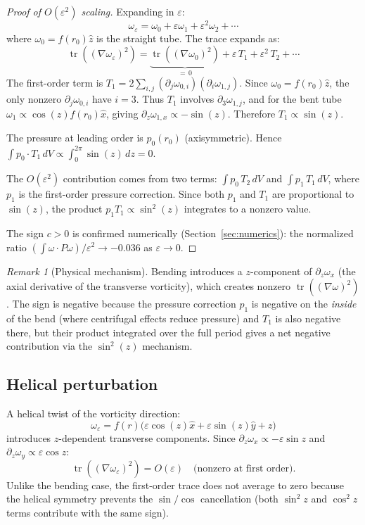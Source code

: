 \documentclass[11pt,a4paper]{article}
\theoremstyle{plain}
\theoremstyle{definition}
\theoremstyle{remark}
\newtheorem{remark}[theorem]{Remark}
\DeclareMathOperator{\tr}{tr}
\begin{document}
\begin{proof}[Proof of $O(\varepsilon^2)$ scaling]
Expanding in $\varepsilon$:
\[
\omega_\varepsilon = \omega_0 + \varepsilon\omega_1
+ \varepsilon^2\omega_2 + \cdots
\]
where $\omega_0 = f(r_0)\hat z$ is the straight
tube.  The trace expands as:
\[
\tr((\nabla\omega_\varepsilon)^2) =
\underbrace{\tr((\nabla\omega_0)^2)}_{=\,0}
+ \varepsilon\,T_1 + \varepsilon^2\,T_2 + \cdots
\]
The first-order term is
$T_1 = 2\sum_{i,j}(\partial_j\omega_{0,i})
(\partial_i\omega_{1,j})$.  Since
$\omega_0=f(r_0)\hat z$, the only nonzero
$\partial_j\omega_{0,i}$ have $i=3$.  Thus $T_1$
involves $\partial_3\omega_{1,j}$, and for the
bent tube $\omega_1 \propto \cos(z)f(r_0)\hat x$,
giving $\partial_z\omega_{1,x}\propto -\sin(z)$.
Therefore $T_1\propto\sin(z)$.

The pressure at leading order is $p_0(r_0)$
(axisymmetric).  Hence
$\int p_0\cdot T_1\,dV
\propto\int_0^{2\pi}\sin(z)\,dz = 0$.

The $O(\varepsilon^2)$ contribution comes from
two terms: $\int p_0\,T_2\,dV$ and
$\int p_1\,T_1\,dV$, where $p_1$ is the
first-order pressure correction.
Since both $p_1$ and $T_1$ are proportional to
$\sin(z)$, the product $p_1 T_1\propto\sin^2(z)$
integrates to a nonzero value.

The sign $c>0$ is confirmed numerically
(Section~\ref{sec:numerics}): the normalized
ratio $(\int\omega\cdot P\omega)/\varepsilon^2
\to -0.036$ as $\varepsilon\to 0$.
\end{proof}

\begin{remark}[Physical mechanism]
\label{rem:bend-mechanism}
Bending introduces a $z$-component of
$\partial_z\omega_x$ (the axial derivative of the
transverse vorticity), which creates nonzero
$\tr((\nabla\omega)^2)$.  The sign is negative
because the pressure correction $p_1$ is negative
on the \emph{inside} of the bend (where
centrifugal effects reduce pressure) and $T_1$ is
also negative there, but their product integrated
over the full period gives a net negative
contribution via the $\sin^2(z)$ mechanism.
\end{remark}

\subsection{Helical perturbation}

A helical twist of the vorticity direction:
\begin{equation}\label{eq:helical}
\omega_\varepsilon = f(r)\bigl(
\varepsilon\cos(z)\hat x
+ \varepsilon\sin(z)\hat y
+ \hat z\bigr)
\end{equation}
introduces $z$-dependent transverse components.
Since $\partial_z\omega_x \propto -\varepsilon\sin z$
and $\partial_z\omega_y \propto \varepsilon\cos z$:
\[
\tr((\nabla\omega_\varepsilon)^2) =
O(\varepsilon)\quad\text{(nonzero at first order)}.
\]
Unlike the bending case, the first-order trace does
not average to zero because the helical symmetry
prevents the $\sin/\cos$ cancellation
(both $\sin^2 z$ and $\cos^2 z$ terms contribute
with the same sign).
\end{document}
